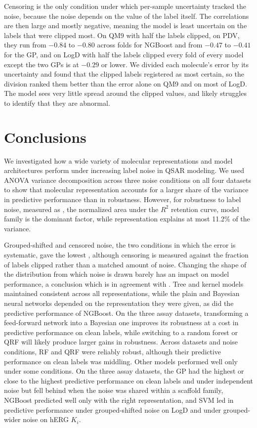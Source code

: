 Censoring is the only condition under which per-sample uncertainty tracked the noise, because the noise depends on the value of the label itself. The correlations are then large and mostly negative, meaning the model is least uncertain on the labels that were clipped most. On QM9 with half the labels clipped, on PDV, they run from $-0.84$ to $-0.80$ across folds for NGBoost and from $-0.47$ to $-0.41$ for the GP, and on LogD with half the labels clipped every fold of every model except the two GPs is at $-0.29$ or lower. We divided each molecule's error by its uncertainty and found that the clipped labels registered as most certain, so the division ranked them better than the error alone on QM9 and on most of LogD. The model sees very little spread around the clipped values, and likely struggles to identify that they are abnormal.

\section{Conclusions}

We investigated how a wide variety of molecular representations and model architectures perform under increasing label noise in QSAR modeling. We used ANOVA variance decomposition across three noise conditions on all four datasets to show that molecular representation accounts for a larger share of the variance in predictive performance than in robustness. However, for robustness to label noise, measured as \aucnorm, the normalized area under the $R^2$ retention curve, model family is the dominant factor, while representation explains at most 11.2\% of the variance.

Grouped-shifted and censored noise, the two conditions in which the error is systematic, gave the lowest \aucnorm{}, although censoring is measured against the fraction of labels clipped rather than a matched amount of noise. Changing the shape of the distribution from which noise is drawn barely has an impact on model performance, a conclusion which is in agreement with \citet{Heid2023}. Tree and kernel models maintained consistent \aucnorm{} across all representations, while the plain and Bayesian neural networks depended on the representation they were given, as did the predictive performance of NGBoost. On the three assay datasets, transforming a feed-forward network into a Bayesian one improves its robustness at a cost in predictive performance on clean labels, while switching to a random forest or QRF will likely produce larger gains in robustness. Across datasets and noise conditions, RF and QRF were reliably robust, although their predictive performance on clean labels was middling. Other models performed well only under some conditions. On the three assay datasets, the GP had the highest or close to the highest predictive performance on clean labels and under independent noise but fell behind when the noise was shared within a scaffold family, NGBoost predicted well only with the right representation, and SVM led in predictive performance under grouped-shifted noise on LogD and under grouped-wider noise on hERG $K_i$.

